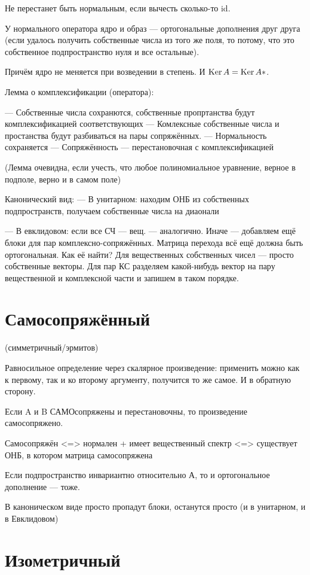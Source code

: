 \documentclass[12pt, a4paper]{article}
\begin{document}
Не перестанет быть нормальным, если вычесть сколько-то id.

У нормального оператора ядро и образ — ортогональные дополнения друг друга (если удалось получить собственные числа из того же поля, то потому, что это собственное подпространство нуля и все остальные).

Причём ядро не меняется при возведении в степень. И $\operatorname{Ker} A = \operatorname{Ker} A*$.

Лемма о комплексификации (оператора):

— Собственные числа сохранются, собственные пропртанства будут комплексификацией соответствующих
— Комлексные собственные числа и простанства будут разбиваться на пары сопряжённых.
— Нормальность сохраняется
— Сопряжённость — перестановочная с комплексификацией

(Лемма очевидна, если учесть, что любое полиномиальное уравнение, верное в подполе, верно и в самом поле)


Канонический вид:
— В унитарном: находим ОНБ из собственных подпространств, получаем собственные числа на диаонали

— В евклидовом: если все СЧ — вещ. — аналогично. Иначе — добавляем ещё блоки для пар комплексно-сопряжённых.
Матрица перехода всё ещё должна быть ортогональная. Как её найти? Для вещественных собственных чисел — просто собственные векторы. 
Для пар КС разделяем какой-нибудь вектор на пару вещественной и комплексной части и запишем в таком порядке.


\section{Самосопряжённый}

(симметричный/эрмитов)

Равносильное определение через скалярное произведение: применить можно как к первому, так и ко второму аргументу, получится то же самое.
И в обратную сторону.

Если A и B САМОсопряжены и перестановочны, то произведение самосопряжено.

Самосопряжён 
<=> нормален + имеет вещественный спектр
<=> существует ОНБ, в котором матрица самосопряжена

Если подпространство инвариантно относительно А, то и ортогональное дополнение — тоже.

В каноническом виде просто пропадут блоки, останутся просто (и в унитарном, и в Евклидовом)


\section{Изометричный}
\end{document}
